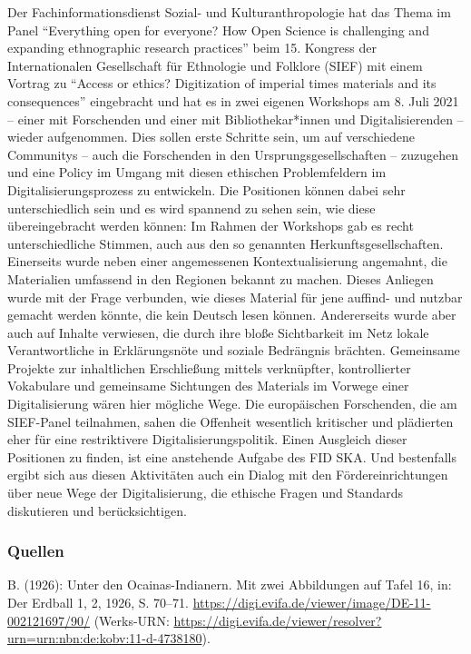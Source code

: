 \documentclass[a4paper,
fontsize=11pt,
oneside,
numbers=noperiodatend,
parskip=half-,
bibliography=totoc,
final
]{scrartcl}
\begin{document}
Der Fachinformationsdienst Sozial- und Kulturanthropologie hat das Thema
im Panel \enquote{Everything open for everyone? How Open Science is
challenging and expanding ethnographic research practices} beim 15.
Kongress der Internationalen Gesellschaft für Ethnologie und Folklore
(SIEF) mit einem Vortrag zu \enquote{Access or ethics? Digitization of
imperial times materials and its consequences} eingebracht und hat es in
zwei eigenen Workshops am 8. Juli 2021 -- einer mit Forschenden und
einer mit Bibliothekar*innen und Digitalisierenden -- wieder
aufgenommen. Dies sollen erste Schritte sein, um auf verschiedene
Communitys -- auch die Forschenden in den Ursprungsgesellschaften --
zuzugehen und eine Policy im Umgang mit diesen ethischen Problemfeldern
im Digitalisierungsprozess zu entwickeln. Die Positionen können dabei
sehr unterschiedlich sein und es wird spannend zu sehen sein, wie diese
übereingebracht werden können: Im Rahmen der Workshops gab es recht
unterschiedliche Stimmen, auch aus den so genannten
Herkunftsgesellschaften. Einerseits wurde neben einer angemessenen
Kontextualisierung angemahnt, die Materialien umfassend in den Regionen
bekannt zu machen. Dieses Anliegen wurde mit der Frage verbunden, wie
dieses Material für jene auffind- und nutzbar gemacht werden könnte, die
kein Deutsch lesen können. Andererseits wurde aber auch auf Inhalte
verwiesen, die durch ihre bloße Sichtbarkeit im Netz lokale
Verantwortliche in Erklärungsnöte und soziale Bedrängnis brächten.
Gemeinsame Projekte zur inhaltlichen Erschließung mittels verknüpfter,
kontrollierter Vokabulare und gemeinsame Sichtungen des Materials im
Vorwege einer Digitalisierung wären hier mögliche Wege. Die europäischen
Forschenden, die am SIEF-Panel teilnahmen, sahen die Offenheit
wesentlich kritischer und plädierten eher für eine restriktivere
Digitalisierungspolitik. Einen Ausgleich dieser Positionen zu finden,
ist eine anstehende Aufgabe des FID SKA. Und bestenfalls ergibt sich aus
diesen Aktivitäten auch ein Dialog mit den Fördereinrichtungen über neue
Wege der Digitalisierung, die ethische Fragen und Standards diskutieren
und berücksichtigen.

\hypertarget{quellen}{%
\subsubsection{Quellen}\label{quellen}}

B. (1926): Unter den Ocainas-Indianern. Mit zwei Abbildungen auf Tafel
16, in: Der Erdball 1, 2, 1926, S. 70--71.
\url{https://digi.evifa.de/viewer/image/DE-11-002121697/90/} (Werks-URN:
\url{https://digi.evifa.de/viewer/resolver?urn=urn:nbn:de:kobv:11-d-4738180}).
\end{document}
